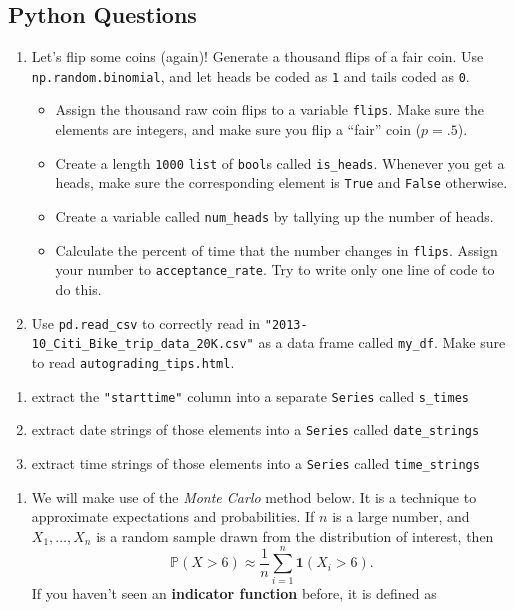 \documentclass[
  12pt,
  krantz2]{krantz}
\providecommand{\tightlist}{%
  \setlength{\itemsep}{0pt}\setlength{\parskip}{0pt}}
\begin{document}
\hypertarget{python-questions-1}{%
\subsection{Python Questions}\label{python-questions-1}}

\begin{enumerate}
\def\labelenumi{\arabic{enumi}.}
\item
  Let's flip some coins (again)! Generate a thousand flips of a fair coin. Use \texttt{np.random.binomial}, and let heads be coded as \texttt{1} and tails coded as \texttt{0}.

  \begin{itemize}
  \tightlist
  \item
    Assign the thousand raw coin flips to a variable \texttt{flips}. Make sure the elements are integers, and make sure you flip a ``fair'' coin (\(p=.5\)).
  \item
    Create a length \texttt{1000} \texttt{list} of \texttt{bool}s called \texttt{is\_heads}. Whenever you get a heads, make sure the corresponding element is \texttt{True} and \texttt{False} otherwise.
  \item
    Create a variable called \texttt{num\_heads} by tallying up the number of heads.
  \item
    Calculate the percent of time that the number changes in \texttt{flips}. Assign your number to \texttt{acceptance\_rate}. Try to write only one line of code to do this.
  \end{itemize}
\item
  Use \texttt{pd.read\_csv} to correctly read in \texttt{"2013-10\_Citi\_Bike\_trip\_data\_20K.csv"} as a data frame called \texttt{my\_df}. Make sure to read \texttt{autograding\_tips.html}.
\end{enumerate}

\begin{enumerate}
\def\labelenumi{\alph{enumi}.}
\item
  extract the \texttt{"starttime"} column into a separate \texttt{Series} called \texttt{s\_times}
\item
  extract date strings of those elements into a \texttt{Series} called \texttt{date\_strings}
\item
  extract time strings of those elements into a \texttt{Series} called \texttt{time\_strings}
\end{enumerate}

\begin{enumerate}
\def\labelenumi{\arabic{enumi}.}
\setcounter{enumi}{2}
\tightlist
\item
  We will make use of the \emph{Monte Carlo} \citep{monte-carlo-stat-methods} method below. It is a technique to approximate expectations and probabilities. If \(n\) is a large number, and \(X_1, \ldots, X_n\) is a random sample drawn from the distribution of interest, then
  \[
  \mathbb{P}(X > 6) \approx \frac{1}{n}\sum_{i=1}^n \mathbf{1}(X_i > 6).
  \]
  If you haven't seen an \textbf{indicator function} before, it is defined as
\end{enumerate}
\end{document}
